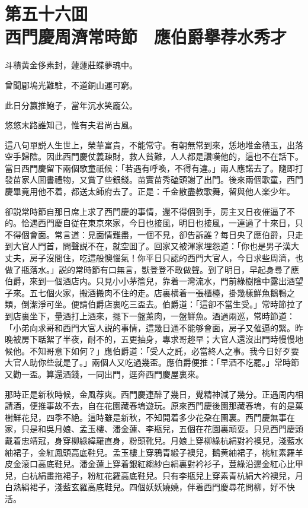 
\chapter*{第五十六囬　\\西門慶周濟常時節　應伯爵擧荐水秀才}


\begin{myquote}
斗積黄金侈素封，蘧蘧莊蝶夢魂中。

曾聞郿塢光難駐，不道銅山運可窮。

此日分籝推鮑子，當年沉水笑龐公。

悠悠末路誰知己，惟有夫君尚古風。
\end{myquote}

這八句單説人生世上，榮華富貴，不能常守。有朝無常到來，恁地堆金積玉，出落空手歸陰。因此西門慶仗義疎財，救人貧難，人人都是讚嘆他的，這也不在話下。當日西門慶留下兩個歌童祇候：「若遇有呼喚，不得有違。」兩人應諾去了。隨即打發苗家人囬書禮物，又賞了些銀錢。苗實苗秀磕頭謝了出門。後來兩個歌童，西門慶畢竟用他不着，都送太師府去了。正是：千金散盡教歌舞，留與他人楽少年。

卻説常時節自那日席上求了西門慶的事情，還不得個到手，房主又日夜催逼了不的。恰遇西門慶自従在東京來家，今日也接風，明日也接風，一連過了十來日，只不得個會面。常言道：見面情難盡，一個不見，卻告訴誰？每日央了應伯爵，只走到大官人門首，問聲説不在，就空囬了。回家又被渾家埋怨道：「你也是男子漢大丈夫，房子沒間住，吃這般懊惱氣！你平日只認的西門大官人，今日求些周濟，也做了瓶落水。」説的常時節有口無言，獃登登不敢做聲。到了明日，早起身尋了應伯爵，來到一個酒店内。只見小小茅簷兒，靠着一灣流水，門前綠樹陰中露出酒望子來。五七個火家，搬酒搬肉不住的走。店裏横着一張櫃檯，掛幾樣鮮魚鵝鴨之類，倒潔淨可坐。便請伯爵店裏吃三盃去。伯爵道：「這卻不當生受。」常時節拉了到店裏坐下，量酒打上酒來，擺下一盤薰肉，一盤鮮魚。酒過兩巡，常時節道：「小弟向求哥和西門大官人説的事情，這幾日通不能够會面，房子又催逼的緊。昨晚被房下聒絮了半夜，耐不的，五更抽身，專求哥趂早；大官人還沒出門時慢慢地候他。不知哥意下如何？」應伯爵道：「受人之託，必當終人之事。我今日好歹要大官人助你些就是了。」兩個人又吃過幾盃。應伯爵便推：「早酒不吃罷。」常時節又勸一盃。算還酒錢，一同出門，逕奔西門慶屋裏來。

那時正是新秋時候，金風荐爽。西門慶連醉了幾日，覺精神減了幾分。正遇周内相請酒，便推事故不去，自在花園藏春塢遊玩。原來西門慶後園那藏春塢，有的是菓樹鮮花兒，四季不絶。這時雖是新秋，不知開着多少花朶在園裏。西門慶無事在家，只是和吳月娘、孟玉樓、潘金蓮、李瓶兒，五個在花園裏頑耍。只見西門慶頭戴着忠靖冠，身穿柳綠緯羅直身，粉頭靴兒。月娘上穿柳綠杭絹對衿襖兒，淺藍水紬裙子，金紅鳳頭高底鞋兒。孟玉樓上穿鴉青緞子襖兒，鵝黄紬裙子，桃紅素羅羊皮金滚口高底鞋兒。潘金蓮上穿着銀紅縐紗白絹裏對衿衫子，荳綠沿邊金紅心比甲兒，白杭絹畫拖裙子，粉紅花羅高底鞋兒。只有李瓶兒上穿素青杭絹大衿襖兒，月白熟絹裙子，淺藍玄羅高底鞋兒。四個妖妖嬈嬈，伴着西門慶尋花問柳，好不快活。

